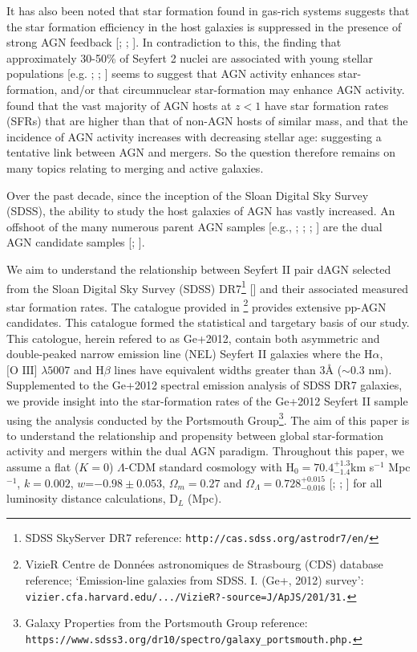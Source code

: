 It has also been noted that star formation found in gas-rich systems suggests that the star formation efficiency in the host galaxies is suppressed in the presence of strong AGN feedback [\cite{1999ApSS.266..207M}; \cite{2004AAS...204.4905B}; \cite{Di_Matteo_2005}]. In contradiction to this, the finding that approximately 30-50\% of Seyfert 2 nuclei are associated with young stellar populations [e.g. \cite{Delgado_2001}; \cite{Storchi_Bergmann_2001}; \cite{Sarzi_2006}] seems to suggest that AGN activity enhances star-formation, and/or that circumnuclear star-formation may enhance AGN activity. \cite{Silverman_2009} found that the vast majority of AGN hosts at $z<1$ have star formation rates (SFRs) that are higher than that of non-AGN hosts of similar mass, and that the incidence of AGN activity increases with decreasing stellar age: suggesting a tentative link between AGN and mergers. So the question therefore remains on many topics relating to merging and active galaxies.

Over the past decade, since the inception of the Sloan Digital Sky Survey (SDSS), the ability to study the host galaxies of AGN has vastly increased. An offshoot of the many numerous parent AGN samples [e.g., \cite{Zakamska2003}; \cite{Kewley_2006}; \cite{Stasinska_2006}; \cite{Wild_2010}] are the dual AGN candidate samples [\cite{Ge_Hu_Wang_Bai_Zhang_2012}; \cite{2012ApJ...753...42C}]. 

We aim to understand the relationship between Seyfert II pair dAGN selected from the Sloan Digital Sky Survey (SDSS) DR7\footnote{\tiny{SDSS SkyServer DR7 reference: \tt{http://cas.sdss.org/astrodr7/en/}}} [\cite{2009ApJS..182..543A}] and their associated measured star formation rates. The catalogue provided in \cite{Ge_Hu_Wang_Bai_Zhang_2012}\footnote{\tiny{VizieR Centre de Donn\'{e}es astronomiques de Strasbourg (CDS) database reference; `Emission-line galaxies from SDSS. I. (Ge+, 2012) survey': \tt{vizier.cfa.harvard.edu/.../VizieR?-source=J/ApJS/201/31}.}} provides extensive pp-AGN candidates. This catalogue formed the statistical and targetary basis of our study. This catologue, herein refered to as Ge+2012, contain both asymmetric and double-peaked narrow emission line (NEL) Seyfert II galaxies where the $\text{H}\alpha$, $\text{[O III]}$ $\lambda{5007}$ and $\text{H}\beta$ lines have equivalent widths greater than 3\AA{ }($\sim{0.3}$ nm). Supplemented to the Ge+2012 spectral emission analysis of SDSS DR7 galaxies, we provide insight into the star-formation rates of the Ge+2012 Seyfert II sample using the analysis conducted by the Portsmouth Group\footnote{\tiny{Galaxy Properties from the Portsmouth Group reference: \tt{https://www.sdss3.org/dr10/spectro/galaxy_portsmouth.php}.}}. The aim of this paper is to understand the relationship and propensity between global star-formation activity and mergers within the dual AGN paradigm. Throughout this paper, we assume a flat ($K=0$) $\Lambda$-CDM standard cosmology with $\text{H}_0={70.4}^{+1.3}_{-1.4}$km s$^{−1}$ Mpc$^{−1}$, $k={0.002}$, $w$=$-0.98\pm{0.053}$, ${\Omega_{m}}={0.27}$ and ${\Omega_{\Lambda}}={{0.728}^{+0.015}_{-0.016}}$ [\cite{Spergel_2003}; \cite{Reid_2010}; \cite{Jarosik_2011}] for all luminosity distance calculations, $\text{D}_L$ (Mpc).